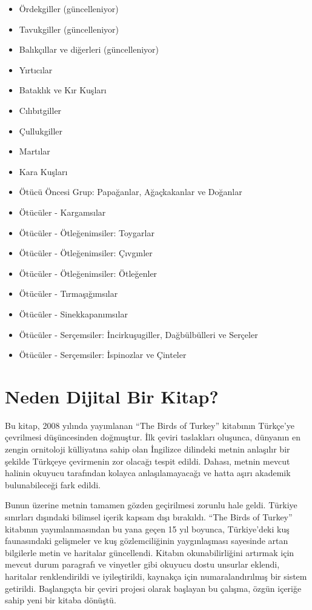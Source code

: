 \documentclass[
  letterpaper,
  DIV=11,
  numbers=noendperiod]{scrreprt}
\providecommand{\tightlist}{%
  \setlength{\itemsep}{0pt}\setlength{\parskip}{0pt}}\usepackage{longtable,booktabs,array}
\begin{document}
\begin{itemize}
\tightlist
\item
  Ördekgiller (güncelleniyor)
\item
  Tavukgiller (güncelleniyor)
\item
  Balıkçıllar ve diğerleri (güncelleniyor)
\item
  Yırtıcılar
\item
  Bataklık ve Kır Kuşları
\item
  Cılıbıtgiller
\item
  Çullukgiller
\item
  Martılar
\item
  Kara Kuşları
\item
  Ötücü Öncesi Grup: Papağanlar, Ağaçkakanlar ve Doğanlar
\item
  Ötücüler - Kargamsılar
\item
  Ötücüler - Ötleğenimsiler: Toygarlar
\item
  Ötücüler - Ötleğenimsiler: Çıvgınler
\item
  Ötücüler - Ötleğenimsiler: Ötleğenler
\item
  Ötücüler - Tırmaşığımsılar
\item
  Ötücüler - Sinekkapanımsılar
\item
  Ötücüler - Serçemsiler: İncirkuşugiller, Dağbülbülleri ve Serçeler
\item
  Ötücüler - Serçemsiler: İspinozlar ve Çinteler
\end{itemize}

\hypertarget{neden-dijital-bir-kitap}{%
\section*{Neden Dijital Bir Kitap?}\label{neden-dijital-bir-kitap}}


Bu kitap, 2008 yılında yayımlanan ``The Birds of Turkey'' kitabının
Türkçe'ye çevrilmesi düşüncesinden doğmuştur. İlk çeviri taslakları
oluşunca, dünyanın en zengin ornitoloji külliyatına sahip olan İngilizce
dilindeki metnin anlaşılır bir şekilde Türkçeye çevirmenin zor olacağı
tespit edildi. Dahası, metnin mevcut halinin okuyucu tarafından kolayca
anlaşılamayacağı ve hatta aşırı akademik bulunabileceği fark edildi.

Bunun üzerine metnin tamamen gözden geçirilmesi zorunlu hale geldi.
Türkiye sınırları dışındaki bilimsel içerik kapsam dışı bırakıldı. ``The
Birds of Turkey'' kitabının yayımlanmasından bu yana geçen 15 yıl
boyunca, Türkiye'deki kuş faunasındaki gelişmeler ve kuş gözlemciliğinin
yaygınlaşması sayesinde artan bilgilerle metin ve haritalar güncellendi.
Kitabın okunabilirliğini artırmak için mevcut durum paragrafı ve
vinyetler gibi okuyucu dostu unsurlar eklendi, haritalar renklendirildi
ve iyileştirildi, kaynakça için numaralandırılmış bir sistem getirildi.
Başlangıçta bir çeviri projesi olarak başlayan bu çalışma, özgün içeriğe
sahip yeni bir kitaba dönüştü.
\end{document}
